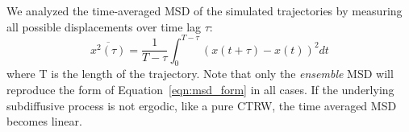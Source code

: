 \documentclass{article}
\begin{document}

  
  We analyzed the time-averaged MSD of the simulated trajectories by measuring
  all possible displacements over time lag $\tau$:
  \begin{equation}
  \overline{x^2(\tau)} = \dfrac{1}{T - \tau}\int_{0}^{T - \tau} (x(t + \tau) - x(t))^2 dt
  \end{equation}
  where T is the length of the trajectory. Note that only the \textit{ensemble} MSD
  will reproduce the form of Equation~\ref{eqn:msd_form} in all cases. 
  If the underlying 
  subdiffusive process is not ergodic, like a pure CTRW, the time averaged MSD becomes
  linear.~\cite{meroz_toolbox_2015} 
  
   
\end{document}
